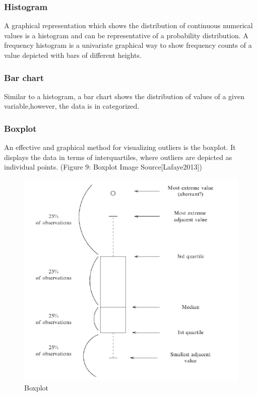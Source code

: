 \documentclass[12pt,]{article}
\begin{document}
\subsubsection{Histogram}\label{histogram}

A graphical representation which shows the distribution of continuous
numerical values is a histogram and can be representative of a
probability distribution. A frequency histogram is a univariate
graphical way to show frequency counts of a value depicted with bars of
different heights.

\subsubsection{Bar chart}\label{bar-chart}

Similar to a histogram, a bar chart shows the distribution of values of
a given variable,however, the data is in categorized.

\subsubsection{Boxplot}\label{boxplot}

An effective and graphical method for visualizing outliers is the
boxplot. It displays the data in terms of interquartiles, where outliers
are depicted as individual points. (Figure 9: Boxplot Image
Source{[}Lafaye2013{]})

\begin{figure}

{\centering \includegraphics{thesis_files/figure-latex/unnamed-chunk-13-1} 

}

\caption{Boxplot}\label{fig:unnamed-chunk-13}
\end{figure}
\end{document}
